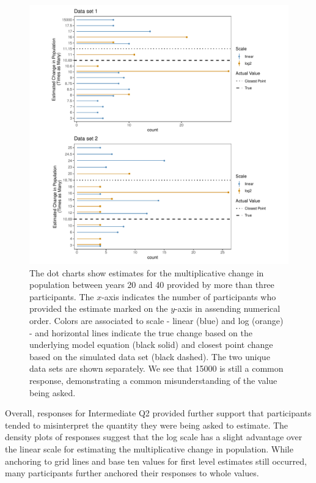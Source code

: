 \documentclass[print]{nuthesis}
\begin{document}
\begin{figure}[tbp]

{\centering \includegraphics[width=1\linewidth,]{thesis_files/figure-latex/qi2-common-responses-1} 

}

\caption[Intermediate Q2 common responses]{The dot charts show estimates for the multiplicative change in population between years 20 and 40 provided by more than three participants. The $x$-axis indicates the number of participants who provided the estimate marked on the $y$-axis in assending numerical order. Colors are associated to scale - linear (blue) and log (orange) - and horizontal lines indicate the true change based on the underlying model equation (black solid) and closest point change based on the simulated data set (black dashed). The two unique data sets are shown separately. We see that 15000 is still a common response, demonstrating a common misunderstanding of the value being asked.}\label{fig:qi2-common-responses}
\end{figure}

Overall, responses for Intermediate Q2 provided further support that participants tended to misinterpret the quantity they were being asked to estimate.
The density plots of responses suggest that the log scale has a slight advantage over the linear scale for estimating the multiplicative change in population.
While anchoring to grid lines and base ten values for first level estimates still occurred, many participants further anchored their responses to whole values.
\end{document}

